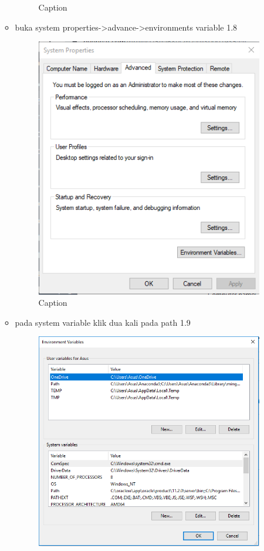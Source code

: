 \begin{enumerate}
\begin{itemize}
\begin{figure}
        \caption{Caption}
        \label{fig:my_label}
    \end{figure}
        \item buka system properties->advance->environments variable 1.8
         \begin{figure}
    \centering
    \includegraphics[scale=0.5]{figures/6.PNG}
        \caption{Caption}
        \label{fig:my_label}
    \end{figure}
        \item pada system variable klik dua kali pada path 1.9
         \begin{figure}
    \centering
    \includegraphics[scale=0.5]{figures/7.PNG}

\end{figure}
\end{itemize}
\end{enumerate}
